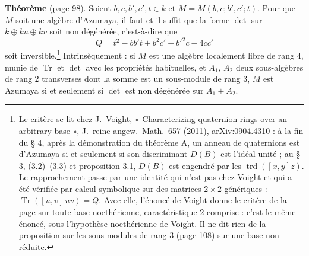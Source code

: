 \documentclass[11pt,a4paper]{article}
\begin{document}
\textbf{Théorème} (page 98). Soient $b, c, b', c', t \in k$ et $M = M(b, c; b',
c'; t)$. Pour que $M$ soit une algèbre d'Azumaya, il faut et il suffit que la
forme $\det$ sur $k \oplus ku \oplus kv$ soit non dégénérée, c'est-à-dire que
\[
  Q = t^2 - bb't + b^2c' + b'^2c - 4cc'
\]
soit inversible.\footnote{Le critère se lit chez J.~Voight,
« Characterizing quaternion rings over an arbitrary base », J.\ reine angew.\
Math.\ 657 (2011), arXiv:0904.4310 : à la fin du § 4, après la démonstration du
théorème A, un anneau de quaternions est d'Azumaya si et seulement si son
discriminant $D(B)$ est l'idéal unité ; au § 3, (3.2)--(3.3) et
proposition 3.1, $D(B)$ est engendré par les $\operatorname{trd}([x, y]z)$.
Le rapprochement passe par une identité qui n'est pas chez Voight et qui a été
vérifiée par calcul symbolique sur des matrices $2 \times 2$ génériques :
$\operatorname{Tr}([u, v]\,uv) = Q$. Avec elle, l'énoncé de Voight donne le
critère de la page sur toute base noethérienne, caractéristique $2$ comprise :
c'est le même énoncé, sous l'hypothèse noethérienne de Voight. Il ne dit rien
de la proposition sur les sous-modules de rang $3$ (page 108) sur une base non
réduite.} Intrinsèquement : si $M$ est une algèbre localement libre de
rang $4$, munie de $\operatorname{Tr}$ et $\det$ avec les propriétés
habituelles, et $A_1$, $A_2$ deux sous-algèbres de rang $2$ transverses dont la
somme est un sous-module de rang $3$, $M$ est Azumaya si et seulement si $\det$
est non dégénérée sur $A_1 + A_2$.
\end{document}
